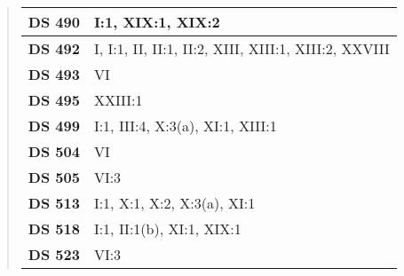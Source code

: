 \begin{quote}
\begin{xltabular}{\linewidth}{ l | X }
        \textbf {DS 490} & I:1, XIX:1, XIX:2 \\ \hline
    
        \textbf {DS 492} & I, I:1, II, II:1, II:2, XIII, XIII:1, XIII:2, XXVIII \\ \hline
    
        \textbf {DS 493} & VI \\ \hline
    
        \textbf {DS 495} & XXIII:1 \\ \hline
    
        \textbf {DS 499} & I:1, III:4, X:3(a), XI:1, XIII:1 \\ \hline
    
        \textbf {DS 504} & VI \\ \hline
    
        \textbf {DS 505} & VI:3 \\ \hline
    
        \textbf {DS 513} & I:1, X:1, X:2, X:3(a), XI:1 \\ \hline
    
        \textbf {DS 518} & I:1, II:1(b), XI:1, XIX:1 \\ \hline
    
        \textbf {DS 523} & VI:3 \\ \hline
    
        \hline
    \end{xltabular}
\end{quote}    
